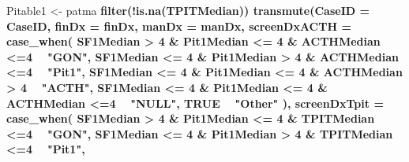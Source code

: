 \documentclass[]{book}
\newenvironment{Shaded}{\begin{snugshade}}{\end{snugshade}}
\newcommand{\DataTypeTok}[1]{\textcolor[rgb]{0.13,0.29,0.53}{#1}}
\newcommand{\DecValTok}[1]{\textcolor[rgb]{0.00,0.00,0.81}{#1}}
\newcommand{\KeywordTok}[1]{\textcolor[rgb]{0.13,0.29,0.53}{\textbf{#1}}}
\newcommand{\NormalTok}[1]{#1}
\newcommand{\OperatorTok}[1]{\textcolor[rgb]{0.81,0.36,0.00}{\textbf{#1}}}
\newcommand{\OtherTok}[1]{\textcolor[rgb]{0.56,0.35,0.01}{#1}}
\newcommand{\StringTok}[1]{\textcolor[rgb]{0.31,0.60,0.02}{#1}}
\begin{document}
\begin{Shaded}
\begin{Highlighting}[]
\NormalTok{Pitable1 <-}\StringTok{ }\NormalTok{patma }\OperatorTok{%
\StringTok{  }\KeywordTok{filter}\NormalTok{(}\OperatorTok{!}\KeywordTok{is.na}\NormalTok{(TPITMedian)) }\OperatorTok{%
\StringTok{  }\KeywordTok{transmute}\NormalTok{(}\DataTypeTok{CaseID =}\NormalTok{ CaseID,}
            \DataTypeTok{finDx =}\NormalTok{ finDx,}
            \DataTypeTok{manDx =}\NormalTok{ manDx,}
            \DataTypeTok{screenDxACTH =} \KeywordTok{case_when}\NormalTok{(}
\NormalTok{              SF1Median }\OperatorTok{>}\StringTok{ }\DecValTok{4} \OperatorTok{&}\StringTok{ }\NormalTok{Pit1Median }\OperatorTok{<=}\StringTok{ }\DecValTok{4} \OperatorTok{&}\StringTok{ }\NormalTok{ACTHMedian }\OperatorTok{<=}\DecValTok{4} \OperatorTok{~}\StringTok{ "GON"}\NormalTok{,}
\NormalTok{              SF1Median }\OperatorTok{<=}\StringTok{ }\DecValTok{4} \OperatorTok{&}\StringTok{ }\NormalTok{Pit1Median }\OperatorTok{>}\StringTok{ }\DecValTok{4} \OperatorTok{&}\StringTok{ }\NormalTok{ACTHMedian }\OperatorTok{<=}\DecValTok{4} \OperatorTok{~}\StringTok{ "Pit1"}\NormalTok{, }
\NormalTok{              SF1Median }\OperatorTok{<=}\StringTok{ }\DecValTok{4} \OperatorTok{&}\StringTok{ }\NormalTok{Pit1Median }\OperatorTok{<=}\StringTok{ }\DecValTok{4} \OperatorTok{&}\StringTok{ }\NormalTok{ACTHMedian }\OperatorTok{>}\StringTok{ }\DecValTok{4} \OperatorTok{~}\StringTok{ "ACTH"}\NormalTok{, }
\NormalTok{              SF1Median }\OperatorTok{<=}\StringTok{ }\DecValTok{4} \OperatorTok{&}\StringTok{ }\NormalTok{Pit1Median }\OperatorTok{<=}\StringTok{ }\DecValTok{4} \OperatorTok{&}\StringTok{ }\NormalTok{ACTHMedian }\OperatorTok{<=}\DecValTok{4} \OperatorTok{~}\StringTok{ "NULL"}\NormalTok{, }
              \OtherTok{TRUE} \OperatorTok{~}\StringTok{ "Other"}
\NormalTok{            ),}
            \DataTypeTok{screenDxTpit =} \KeywordTok{case_when}\NormalTok{(}
\NormalTok{              SF1Median }\OperatorTok{>}\StringTok{ }\DecValTok{4} \OperatorTok{&}\StringTok{ }\NormalTok{Pit1Median }\OperatorTok{<=}\StringTok{ }\DecValTok{4} \OperatorTok{&}\StringTok{ }\NormalTok{TPITMedian }\OperatorTok{<=}\DecValTok{4} \OperatorTok{~}\StringTok{ "GON"}\NormalTok{,}
\NormalTok{              SF1Median }\OperatorTok{<=}\StringTok{ }\DecValTok{4} \OperatorTok{&}\StringTok{ }\NormalTok{Pit1Median }\OperatorTok{>}\StringTok{ }\DecValTok{4} \OperatorTok{&}\StringTok{ }\NormalTok{TPITMedian }\OperatorTok{<=}\DecValTok{4} \OperatorTok{~}\StringTok{ "Pit1"}\NormalTok{, }
}}
\end{Highlighting}
\end{Shaded}
\end{document}
